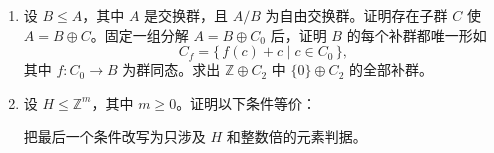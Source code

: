 \begin{exercise}\label{b1:ex:09-free-quotient-splitting}
	\begin{enumerate}
		\item 设 \(B\leq A\)，其中 \(A\) 是交换群，且 \(A/B\) 为自由交换群。证明存在子群 \(C\) 使 \(A=B\oplus C\)。固定一组分解 \(A=B\oplus C_0\) 后，证明 \(B\) 的每个补群都唯一形如
			\[
				C_f=\{\,f(c)+c\mid c\in C_0\,\},
			\]
			其中 \(f:C_0\to B\) 为群同态。求出 \(\mathbb Z\oplus C_2\) 中 \(\{0\}\oplus C_2\) 的全部补群。
		\item 设 \(H\leq\mathbb Z^m\)，其中 \(m\geq0\)。证明以下条件等价：
			把最后一个条件改写为只涉及 \(H\) 和整数倍的元素判据。
	\end{enumerate}
\end{exercise}
